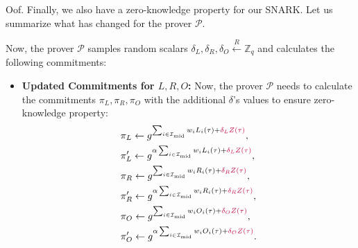 \documentclass[../lecture-notes.tex]{subfiles}
\begin{document}
Oof. Finally, we also have a zero-knowledge property for our SNARK. Let us summarize what has changed for the prover $\mathcal{P}$.

\begin{proposition}
    Now, the prover $\mathcal{P}$ samples random scalars $\delta_L, \delta_R, \delta_O \xleftarrow{R} \mathbb{Z}_q$ and calculates the following commitments:
    \begin{itemize}
        \item \textbf{Updated Commitments for $L,R,O$:} Now, the prover $\mathcal{P}$ needs to calculate the commitments $\pi_L,\pi_R,\pi_O$ with the additional $\delta$'s values to ensure zero-knowledge property:
        \begin{equation*}
            \begin{aligned}
                &\pi_L \gets g^{\sum_{i \in \mathcal{I}_{\text{mid}}}w_iL_i(\tau) + \textcolor{purple}{\delta_LZ(\tau)}}, \\ & \pi_L' \gets g^{\alpha\sum_{i \in \mathcal{I}_{\text{mid}}}w_iL_i(\tau) + \textcolor{purple}{\delta_LZ(\tau)}}, \\
                &\pi_R \gets g^{\sum_{i \in \mathcal{I}_{\text{mid}}}w_iR_i(\tau) + \textcolor{purple}{\delta_RZ(\tau)}}, \\ & \pi_R' \gets g^{\alpha\sum_{i \in \mathcal{I}_{\text{mid}}}w_iR_i(\tau) + \textcolor{purple}{\delta_RZ(\tau)}}, \\
                &\pi_O \gets g^{\sum_{i \in \mathcal{I}_{\text{mid}}}w_iO_i(\tau) + \textcolor{purple}{\delta_OZ(\tau)}}, \\ & \pi_O' \gets g^{\alpha\sum_{i \in \mathcal{I}_{\text{mid}}}w_iO_i(\tau) + \textcolor{purple}{\delta_OZ(\tau)}}.
            \end{aligned}
        \end{equation*}
        

\end{itemize}
\end{proposition}
\end{document}
